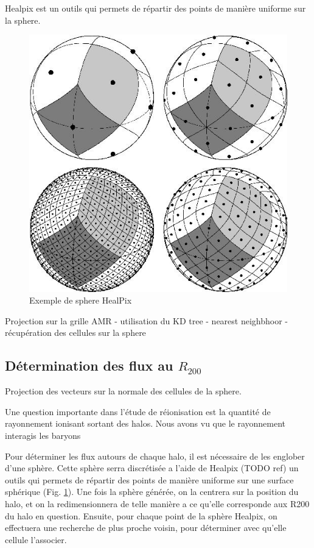 Healpix est un outils qui permets de répartir des points de manière uniforme sur la sphere.

\begin{figure}[bth]
        \includegraphics[width=.95\linewidth]{img/03/healpix.jpg} 
        \caption{Exemple de sphere HealPix}
 		\label{fig:HealPix}
\end{figure}

Projection sur la grille AMR
 - utilisation du KD tree
 - nearest neighbhoor
 - récupération des cellules sur la sphere
 

\subsection{Détermination des flux au $R_{200}$}
\label{sec:healpix}

Projection des vecteurs sur la normale des cellules de la sphere.

Une question importante dans l’étude de réionisation est la quantité de rayonnement ionisant sortant des halos.
Nous avons vu que le rayonnement interagis les baryons


Pour déterminer les flux autours de chaque halo, il est nécessaire de les englober d'une sphère.
Cette sphère serra discrétisée a l'aide de Healpix (TODO ref) un outils qui permets de répartir des points de manière uniforme sur une surface sphérique (Fig. \ref{fig:HealPix}).
Une fois la sphère générée, on la centrera sur la position du halo, et on la redimensionnera de telle manière a ce qu'elle corresponde aux R200 du halo en question.
Ensuite, pour chaque point de la sphère Healpix, on effectuera une recherche de plus proche voisin, pour déterminer avec qu'elle cellule l'associer.

